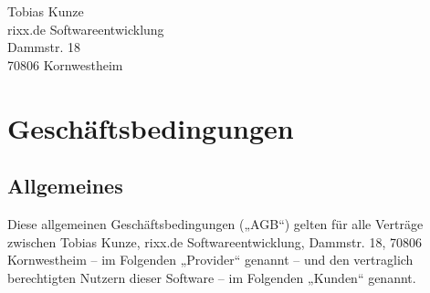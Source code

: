 \documentclass{terms}
\begin{document}
\maketitle

\begin{center}
Tobias Kunze\\
rixx.de Softwareentwicklung\\
Dammstr. 18\\
70806 Kornwestheim
\end{center}
\sloppy

\section{Geschäftsbedingungen}

\subsection{Allgemeines}

Diese allgemeinen Geschäftsbedingungen („AGB“) gelten für alle Verträge zwischen Tobias Kunze, rixx.de Softwareentwicklung, Dammstr. 18, 70806 Kornwestheim – im Folgenden „Provider“ genannt –
und den vertraglich berechtigten Nutzern dieser Software – im Folgenden „Kunden“ genannt.
\end{document}
